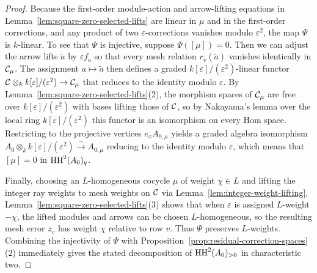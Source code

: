 \begin{proof}
Because the first-order module-action and arrow-lifting equations in
Lemma~\ref{lem:square-zero-selected-lifts} are linear in $\mu$ and in the
first-order corrections, and any product of two $\varepsilon$-corrections
vanishes modulo $\varepsilon^2$, the map $\Psi$ is $k$-linear. To see that
$\Psi$ is injective, suppose $\Psi([\mu])=0$. Then we can adjust the arrow
lifts $\tilde a$ by $\varepsilon f_a$ so that every mesh relation $r_v(\tilde a)$
vanishes identically in $\mathcal C_\mu$. The assignment $a\mapsto\tilde a$ then
defines a graded $k[\varepsilon]/(\varepsilon^2)$-linear functor
$\mathcal C\otimes_k k[\varepsilon]/(\varepsilon^2)\to\mathcal C_\mu$ that reduces to the
identity modulo $\varepsilon$. By Lemma~\ref{lem:square-zero-selected-lifts}(2),
the morphism spaces of $\mathcal C_\mu$ are free over $k[\varepsilon]/(\varepsilon^2)$
with bases lifting those of $\mathcal C$, so by Nakayama's lemma over the local ring
$k[\varepsilon]/(\varepsilon^2)$ this functor is an isomorphism on every Hom
space. Restricting to the projective vertices $e_x A_{0,\mu}$ yields a
graded algebra isomorphism $A_0\otimes_k k[\varepsilon]/(\varepsilon^2)\xrightarrow{\sim}A_{0,\mu}$
reducing to the identity modulo $\varepsilon$, which means that $[\mu]=0$ in
$\operatorname{HH}^2(A_0)_q$.

Finally, choosing an $L$-homogeneous cocycle $\mu$ of weight $\chi\in L$ and
lifting the integer ray weights to mesh weights on $\mathcal C$ via
Lemma~\ref{lem:integer-weight-lifting}, Lemma~\ref{lem:square-zero-selected-lifts}(3)
shows that when $\varepsilon$ is assigned $L$-weight $-\chi$, the lifted
modules and arrows can be chosen $L$-homogeneous, so the resulting mesh
error $z_v$ has weight $\chi$ relative to row $v$. Thus $\Psi$ preserves
$L$-weights. Combining the injectivity of $\Psi$ with
Proposition~\ref{prop:residual-correction-spaces}(2) immediately gives the
stated decomposition of $\operatorname{HH}^2(A_0)_{>0}$ in characteristic two.
\end{proof}

